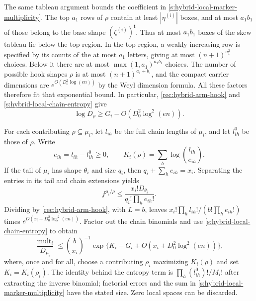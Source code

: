 The same tableau argument bounds the coefficient in
\eqref{s:hybrid-local-marker-multiplicity}. The top $a_1$ rows of
$\rho$ contain at least $|\eta^{(i)}|$ boxes, and at most $a_1b_1$
of those belong to the base shape $(\zeta^{(i)})^{\mathsf t}$.
Thus at most $a_1b_1$ boxes of the skew tableau lie below the top
region. In the top region, a weakly increasing row is specified by
its counts of the at most $a_1$ letters, giving at most
$(n+1)^{a_1^2}$ choices. Below it there are at most
$\max(1,a_1)^{a_1b_1}$ choices. The number of possible hook shapes
$\rho$ is at most $(n+1)^{a_1+b_1}$, and the compact carrier
dimensions are $e^{O(D_0^2\log(en))}$ by the Weyl dimension formula.
All these factors therefore fit that exponential bound. In particular,
\eqref{rec:hybrid-arm-hook} and
\eqref{s:hybrid-local-chain-entropy} give
\begin{equation}\label{s:hybrid-unmarked-dimension}
 \log D_\rho\ge G_i-O(D_0^2\log^2(en)).
\end{equation}

For each contributing $\rho\subseteq\mu_i$, let $l_{ih}$ be the
full chain lengths of $\mu_i$, and let $l^0_{ih}$ be those of
$\rho$. Write
\[
 e_{ih}=l_{ih}-l^0_{ih}\ge0,\qquad
 K_i(\rho)=\sum_h\log\binom{l_{ih}}{e_{ih}}.
\]
If the tail of $\mu_i$ has shape $\theta_i$ and size $q_i$, then
$q_i+\sum_he_{ih}=x_i$. Separating the entries in its tail and
chain extensions yields
\[
 f^{\mu_i/\rho}\le
       \frac{x_i!D_{\theta_i}}{q_i!\prod_he_{ih}!}.
\]
Dividing by \eqref{rec:hybrid-arm-hook}, with $L=b$, leaves
$x_i!\prod_hl_{ih}!/(b!\prod_he_{ih}!)$ times
$e^{O(x_i+D_0^2\log^2(en))}$. Factor out the chain binomials and
use \eqref{s:hybrid-local-chain-entropy} to obtain
\begin{equation}\label{s:hybrid-local-ratio}
 \frac{\operatorname{mult}_i}{D_{\mu_i}}
 \le\binom b{x_i}^{-1}
       \exp\{K_i-G_i+O(x_i+D_0^2\log^2(en))\},
\end{equation}
where, once and for all, choose a contributing $\rho_i$ maximizing
$K_i(\rho)$ and set $K_i=K_i(\rho_i)$.
The identity behind the entropy term is
$\prod_h(l^0_{ih})!/M_i!$ after extracting the inverse binomial;
factorial errors and the sum in
\eqref{s:hybrid-local-marker-multiplicity} have the stated size.
Zero local spaces can be discarded.

